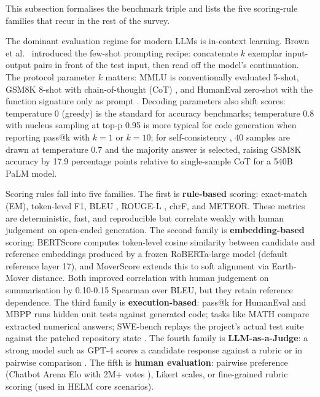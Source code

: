 \documentclass{article}
\begin{document}
This subsection formalises the benchmark triple and lists the five scoring-rule families that recur in the rest of the survey.

The dominant evaluation regime for modern LLMs is in-context learning. Brown et al.~\cite{brown20202020} introduced the few-shot prompting recipe: concatenate \(k\) exemplar input-output pairs in front of the test input, then read off the model's continuation. The protocol parameter \(k\) matters: MMLU is conventionally evaluated 5-shot, GSM8K 8-shot with chain-of-thought (CoT) \cite{wei2022emergentabilitieso,cobbe20212021}, and HumanEval zero-shot with the function signature only as prompt \cite{chen20212021}. Decoding parameters also shift scores: temperature 0 (greedy) is the standard for accuracy benchmarks; temperature 0.8 with nucleus sampling at top-p 0.95 is more typical for code generation when reporting pass@k with \(k=1\) or \(k=10\); for self-consistency \cite{wang20232023}, 40 samples are drawn at temperature 0.7 and the majority answer is selected, raising GSM8K accuracy by 17.9 percentage points relative to single-sample CoT for a 540B PaLM model.

Scoring rules fall into five families. The first is \textbf{rule-based} scoring: exact-match (EM), token-level F1, BLEU \cite{papineni2002bleuamethodforauto}, ROUGE-L \cite{lin2004rougeapackageforau}, chrF, and METEOR. These metrics are deterministic, fast, and reproducible but correlate weakly with human judgement on open-ended generation. The second family is \textbf{embedding-based} scoring: BERTScore \cite{zhang2020bertscoreevaluatin} computes token-level cosine similarity between candidate and reference embeddings produced by a frozen RoBERTa-large model (default reference layer 17), and MoverScore extends this to soft alignment via Earth-Mover distance. Both improved correlation with human judgement on summarisation by 0.10-0.15 Spearman over BLEU, but they retain reference dependence. The third family is \textbf{execution-based}: pass@k for HumanEval and MBPP runs hidden unit tests against generated code; tasks like MATH compare extracted numerical answers; SWE-bench replays the project's actual test suite against the patched repository state \cite{jimenez20242024}. The fourth family is \textbf{LLM-as-a-Judge}: a strong model such as GPT-4 scores a candidate response against a rubric or in pairwise comparison \cite{zheng20232023,liu2023gevalnlgevaluation}. The fifth is \textbf{human evaluation}: pairwise preference (Chatbot Arena Elo with 2M+ votes \cite{chiang20242024}), Likert scales, or fine-grained rubric scoring (used in HELM core scenarios).
\end{document}
